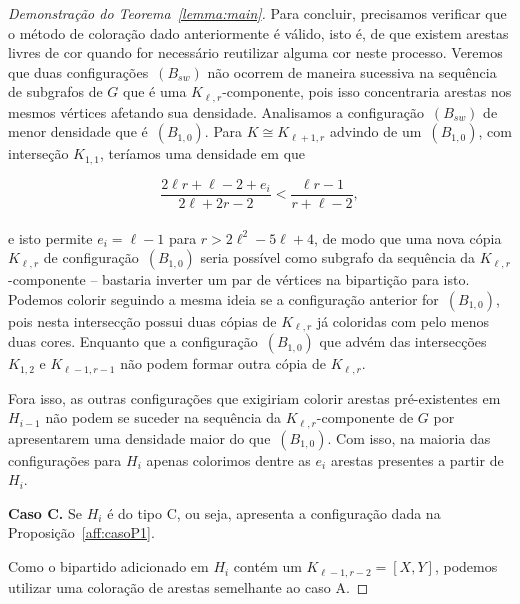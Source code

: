 \documentclass[12pt,a4paper]{book}
\newcommand{\K}{K_{\ell,r}} %
\begin{document}
\begin{proof}[Demonstração do Teorema~\ref{lemma:main}]
        Para concluir, precisamos verificar que o método de coloração dado anteriormente é válido, isto é, de que existem arestas livres de cor quando for necessário reutilizar alguma cor neste processo.
        Veremos que duas configurações~\hyperlink{HconfigB}{$(B_{sw})$} não ocorrem de maneira sucessiva na sequência de subgrafos  de $G$ que é uma $\K$-componente, pois isso concentraria arestas nos mesmos vértices afetando sua densidade. %
        Analisamos a configuração~\hyperlink{HconfigB}{$(B_{sw})$} de menor densidade que é~\hyperlink{HconfigB}{$(B_{1,0})$}.
        Para $K \cong K_{\ell+1,r}$ advindo de um~\hyperlink{HconfigB}{$(B_{1,0})$}, com interseção $K_{1,1}$, teríamos uma densidade em que 
        
        \[
            \frac{2\ell r+\ell-2+e_i}{2\ell+2r-2} < \frac{\ell
r-1}{r+\ell-2},
        \]
        \\
        e isto permite $e_i = \ell-1$ para $r > 2\ell^2-5\ell+4$,
        de modo que uma nova cópia $\K$ de configuração~\hyperlink{HconfigB}{$(B_{1,0})$} seria possível como subgrafo da sequência da $\K$-componente -- bastaria inverter um par de vértices na bipartição para isto.
         Podemos colorir seguindo a mesma ideia se a configuração anterior for~\hyperlink{HconfigB}{$(B_{1,0})$}, pois nesta intersecção possui duas cópias de $\K$ já coloridas com pelo menos duas cores.
        Enquanto que a configuração~\hyperlink{HconfigB}{$(B_{1,0})$}
que advém das intersecções $K_{1,2}$ e $K_{\ell-1,r-1}$ não podem formar outra cópia de $\K$.  

 
        Fora isso, as outras configurações que exigiriam colorir arestas pré-existentes em $H_{i-1}$ não podem se suceder na sequência da $\K$-componente de $G$ por apresentarem uma densidade maior do que~\hyperlink{HconfigB}{$(B_{1,0})$}.
        Com isso, na maioria das configurações para $H_i$ apenas colorimos dentre as $e_i$ arestas presentes a partir de $H_i$.

        \medskip \textbf{Caso C.} Se $H_i$ é do tipo C, ou seja, apresenta a configuração dada na Proposição~\ref{aff:casoP1}.

        Como o bipartido adicionado em $H_i$ contém um $K_{\ell-1,r-2}=[X,Y]$, podemos utilizar uma coloração de arestas semelhante ao caso A.
        
     \end{proof}
 
\end{document}
